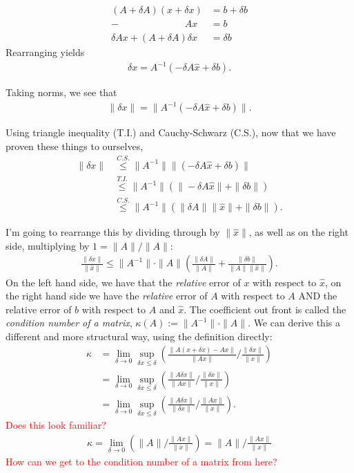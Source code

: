 \documentclass{ximera}
\begin{document}
\begin{align*}
    (A+\delta A)(x+\delta x) &= b+ \delta b \\
    - \phantom{yoooomannnnn} Ax&=b\\
    \hline
    \delta Ax + (A+\delta A)\delta x &= \delta b
\end{align*}
Rearranging yields
\begin{align}
    \delta x = A^{-1}(-\delta A\hat{x} + \delta b).
\end{align}

Taking norms, we see that 
\begin{align}
    \|\delta x\| = \|A^{-1}(-\delta A\hat{x} + \delta b)\|.
\end{align}

Using triangle inequality (T.I.) and Cauchy-Schwarz (C.S.), now that we have proven these things to ourselves,
\begin{align*}
    \|\delta x\| &\stackrel{C.S.}\leq \|A^{-1}\|\|(-\delta A\hat{x} + \delta b)\| 
    \\
    &\stackrel{T.I.}\leq \|A^{-1}\|(\|-\delta A\hat{x}\| + \|\delta b\| )
    \\
    &\stackrel{C.S.}\leq \|A^{-1}\|(\|\delta A\|\|\hat{x}\| + \|\delta b\| ).
\end{align*}

I'm going to rearrange this by dividing through by $\|\hat{x}\|$, as well as on the right side, multiplying by $1 = \|A\|/\|A\|$:
\begin{align*}
    \frac{\|\delta x\|}{\|\hat{x}\|} \leq \|A^{-1}\|\cdot \|A\|\left(\frac{\|\delta A\|}{\|A\|} + \frac{\|\delta b\|}{\|A\|\|\hat{x}\|}\right ).
\end{align*}
    On the left hand side, we have that the \textit{relative} error of $x$ with respect to $\hat{x}$,  on the right hand side we have the \textit{relative} error of $A$ with respect to $A$ AND the relative error of $b$ with respect to $A$ and $\hat{x}$.  The coefficient out front is called the \textit{condition number of a matrix}, $\kappa(A) := \|A^{-1}\|\cdot \|A\|$.  We can derive this a different and more structural way, using the definition directly:
    \begin{align*}
        \kappa &= \lim\limits_{\delta \to 0}\sup\limits_{\delta x \leq \delta} \left( \frac{\|A(x+\delta x ) - Ax\|}{\|Ax\|}\Big/ \frac{\|\delta x\|}{\|x\|}
        \right)
        \\
        &= \lim\limits_{\delta \to 0}\sup\limits_{\delta x \leq \delta} \left( \frac{\|A\delta x\|}{\|Ax\|}\Big/ \frac{\|\delta x\|}{\|x\|}
        \right)
        \\
        &= \lim\limits_{\delta \to 0}\sup\limits_{\delta x \leq \delta} \left( \frac{\|A\delta x\|}{\|\delta x\|}\Big/ \frac{\|Ax\|}{\|x\|}
        \right).
    \end{align*}
    \textcolor{red}{Does this look familiar?}
    \begin{align*}
        \kappa = \lim\limits_{\delta \to 0}
       \left( \|A\|\Big/ \frac{\|Ax\|}{\|x\|}
        \right) = \|A\|\Big/ \frac{\|Ax\|}{\|x\|}
    \end{align*}
    \textcolor{red}{How can we get to the condition number of a matrix from here?}
\end{document}
